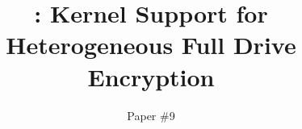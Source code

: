 
\def \mytitle {\sys: Kernel Support for Heterogeneous Full Drive Encryption}


\title{\textsf{\mytitle}}

\author{Paper \#9}

\date{}

\maketitle
